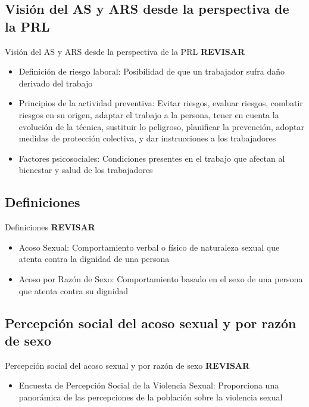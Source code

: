 \documentclass{beamer}
\begin{document}
    \subsection{Visión del AS y ARS desde la perspectiva de la PRL}
    \begin{frame}{Visión del AS y ARS desde la perspectiva de la PRL}
        \textbf{REVISAR}
        \begin{itemize}
            \item Definición de riesgo laboral: Posibilidad de que un trabajador sufra daño derivado del trabajo
            \item Principios de la actividad preventiva: Evitar riesgos, evaluar riesgos, combatir riesgos en su origen, adaptar el trabajo a la persona, tener en cuenta la evolución de la técnica, sustituir lo peligroso, planificar la prevención, adoptar medidas de protección colectiva, y dar instrucciones a los trabajadores
            \item Factores psicosociales: Condiciones presentes en el trabajo que afectan al bienestar y salud de los trabajadores
        \end{itemize}
    \end{frame}

    \subsection{Definiciones}
    \begin{frame}{Definiciones}
        \textbf{REVISAR}
        \begin{itemize}
            \item Acoso Sexual: Comportamiento verbal o físico de naturaleza sexual que atenta contra la dignidad de una persona
            \item Acoso por Razón de Sexo: Comportamiento basado en el sexo de una persona que atenta contra su dignidad
        \end{itemize}
    \end{frame}

    \subsection{Percepción social del acoso sexual y por razón de sexo}
    \begin{frame}{Percepción social del acoso sexual y por razón de sexo}
        \textbf{REVISAR}
        \begin{itemize}
            \item Encuesta de Percepción Social de la Violencia Sexual: Proporciona una panorámica de las percepciones de la población sobre la violencia sexual
        \end{itemize}
    \end{frame}
\end{document}
